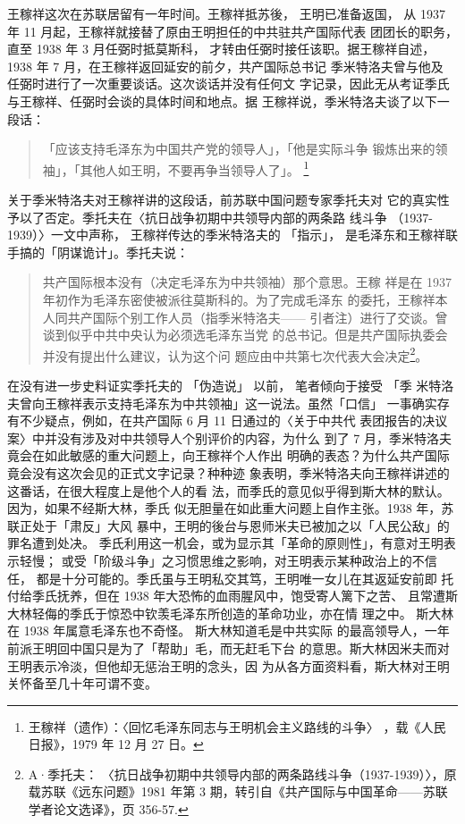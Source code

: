 王稼祥这次在苏联居留有一年时间。王稼祥抵苏後， 王明已准备返国， 从 1937
年 11 月起，王稼祥就接替了原由王明担任的中共驻共产国际代表 团团长的职务，
直至 1938 年 3 月任弼时抵莫斯科， 才转由任弼时接任该职。据王稼祥自述，
1938 年 7 月，在王稼祥返回延安的前夕，共产国际总书记 季米特洛夫曾与他及
任弼时进行了一次重要谈话。这次谈话并没有任何文 字记录，因此无从考证季氏
与王稼祥、任弼时会谈的具体时间和地点。据 王稼祥说，季米特洛夫谈了以下一
段话：
\begin{quote}
	\fzwkai 「应该支持毛泽东为中国共产党的领导人」，「他是实际斗争
	锻炼出来的领袖」，「其他人如王明，不要再争当领导人了」。
	\footnote{王稼祥（遗作）：〈回忆毛泽东同志与王明机会主义路线的斗争〉
，载《人民日报》，1979 年 12 月 27 日。} 
\end{quote}

关于季米特洛夫对王稼祥讲的这段话，前苏联中国问题专家季托夫对
它的真实性予以了否定。季托夫在〈抗日战争初期中共领导内部的两条路
线斗争
（1937-1939）〉一文中声称，
王稼祥传达的季米特洛夫的
「指示」，
是毛泽东和王稼祥联手搞的「阴谋诡计」。季托夫说：
\begin{quote}
	\fzwkai 共产国际根本没有（决定毛泽东为中共领袖）那个意思。王稼
祥是在 1937 年初作为毛泽东密使被派往莫斯科的。为了完成毛泽东
的委托，王稼祥本人同共产国际个别工作人员（指季米特洛夫——
引者注）进行了交谈。曾谈到似乎中共中央认为必须选毛泽东当党
的总书记。但是共产国际执委会并没有提出什么建议，认为这个问
题应由中共第七次代表大会决定\footnote{ A·季托夫：
〈抗日战争初期中共领导内部的两条路线斗争（1937-1939）〉，原载苏联《远东问题》1981 年第 3
期，转引自《共产国际与中国革命——苏联学者论文选译》，页 356-57.}。
\end{quote}

在没有进一步史料证实季托夫的
「伪造说」
以前，
笔者倾向于接受
「季
米特洛夫曾向王稼祥表示支持毛泽东为中共领袖」这一说法。虽然「口信」
一事确实存有不少疑点，例如，在共产国际 6 月 11 日通过的〈关于中共代
表团报告的决议案〉中并没有涉及对中共领导人个别评价的内容，为什么
到了 7 月，季米特洛夫竟会在如此敏感的重大问题上，向王稼祥个人作出
明确的表态？为什么共产国际竟会没有这次会见的正式文字记录？种种迹
象表明，季米特洛夫向王稼祥讲述的这番话，在很大程度上是他个人的看
法，而季氏的意见似乎得到斯大林的默认。因为，如果不经斯大林，季氏
似无胆量在如此重大问题上自作主张。1938 年，苏联正处于「肃反」大风
暴中，王明的後台与恩师米夫已被加之以「人民公敌」的罪名遭到处决。
季氏利用这一机会，或为显示其「革命的原则性」，有意对王明表示轻慢；
或受「阶级斗争」之习惯思维之影响，对王明表示某种政治上的不信任，
都是十分可能的。季氏虽与王明私交其笃，王明唯一女儿在其返延安前即
托付给季氏抚养，但在 1938 年大恐怖的血雨腥风中，饱受寄人篱下之苦、
且常遭斯大林轻侮的季氏于惊恐中钦羡毛泽东所创造的革命功业，亦在情
理之中。
斯大林在 1938 年属意毛泽东也不奇怪。
斯大林知道毛是中共实际
的最高领导人，一年前派王明回中国只是为了「帮助」毛，而无赶毛下台
的意思。斯大林因米夫而对王明表示冷淡，但他却无惩治王明的念头，因
为从各方面资料看，斯大林对王明关怀备至几十年可谓不变。

